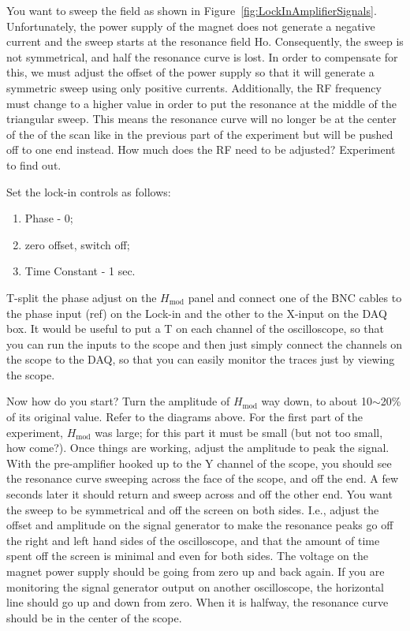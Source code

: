 \documentclass{../lab}
\begin{document}
You want to sweep the field as shown in Figure~\ref{fig:LockInAmplifierSignals}. Unfortunately, the power supply of the magnet does not generate a negative current and the sweep starts at the resonance field Ho. Consequently, the sweep is not symmetrical, and half the resonance curve is lost. In order to compensate for this, we must adjust the offset of the power supply so that it will generate a symmetric sweep using only positive currents. Additionally, the RF frequency must change to a higher value in order to put the resonance at the middle of the triangular sweep. This means the resonance curve will no longer be at the center of the of the scan like in the previous part of the experiment but will be pushed off to one end instead. How much does the RF need to be adjusted? Experiment to find out.

Set the lock-in controls as follows:

\begin{enumerate}
    \item Phase - 0;

    \item zero offset, switch off;

    \item Time Constant - 1 sec.
\end{enumerate}

T-split the phase adjust on the $H_\text{mod}$ panel and connect one of the BNC cables to the phase input (ref) on the Lock-in and the other to the X-input on the DAQ box. It would be useful to put a T on each channel of the oscilloscope, so that you can run the inputs to the scope and then just simply connect the channels on the scope to the DAQ, so that you can easily monitor the traces just by viewing the scope.

Now how do you start? Turn the amplitude of $H_\text{mod}$ way down, to about 10$\sim$20\% of its original value. Refer to the diagrams above. For the first part of the experiment, $H_\text{mod}$ was large; for this part it must be small (but not too small, how come?). Once things are working, adjust the amplitude to peak the signal. With the pre-amplifier hooked up to the Y channel of the scope, you should see the resonance curve sweeping across the face of the scope, and off the end. A few seconds later it should return and sweep across and off the other end. You want the sweep to be symmetrical and off the screen on both sides. I.e., adjust the offset and amplitude on the signal generator to make the resonance peaks go off the right and left hand sides of the oscilloscope, and that the amount of time spent off the screen is minimal and even for both sides. The voltage on the magnet power supply should be going from zero up and back again. If you are monitoring the signal generator output on another oscilloscope, the horizontal line should go up and down from zero. When it is halfway, the resonance curve should be in the center of the scope.
\end{document}
